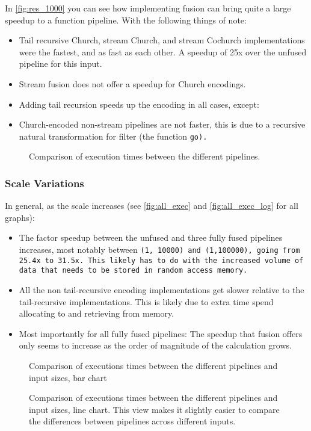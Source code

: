 In \autoref{fig:res_1000} you can see how implementing fusion can bring quite a large speedup to a function pipeline.
With the following things of note:
\begin{itemize}[noitemsep]
    \item Tail recursive Church, stream Church, and stream Cochurch implementations were the fastest, and as fast as each other. A speedup of 25x over the unfused pipeline for this input.
    \item Stream fusion does not offer a speedup for Church encodings.
    \item Adding tail recursion speeds up the encoding in all cases, except:
    \item Church-encoded non-stream pipelines are not faster, this is due to a recursive natural transformation for filter (the function \tt{go}).
\end{itemize}

\begin{figure}[h]
    
    \caption{Comparison of execution times between the different pipelines.}
    \label{fig:res_1000}
\end{figure}

\subsubsection{Scale Variations}\label{sec:scale_var}
In general, as the scale increases (see \autoref{fig:all_exec} and \autoref{fig:all_exec_log} for all graphs):
\begin{itemize}[noitemsep]
    \item The factor speedup between the unfused and three fully fused pipelines increases, most notably between \tt{(1, 10000)} and \tt{(1,100000)}, going from 25.4x to 31.5x.
    This likely has to do with the increased volume of data that needs to be stored in random access memory.
    \item All the non tail-recursive encoding implementations get slower relative to the tail-recursive implementations.
    This is likely due to extra time spend allocating to and retrieving from memory.
    \item Most importantly for all fully fused pipelines: The speedup that fusion offers only seems to increase as the order of magnitude of the calculation grows.
\end{itemize}

\begin{figure}[H]
    \centering
    
    \caption{Comparison of executions times between the different pipelines and input sizes, bar chart}
    \label{fig:results1}
\end{figure}
\begin{figure}[H]
    \centering
    
    \caption{Comparison of executions times between the different pipelines and input sizes, line chart. This view makes it slightly easier to compare the differences between pipelines across different inputs.}
    \label{fig:results2}
\end{figure}
